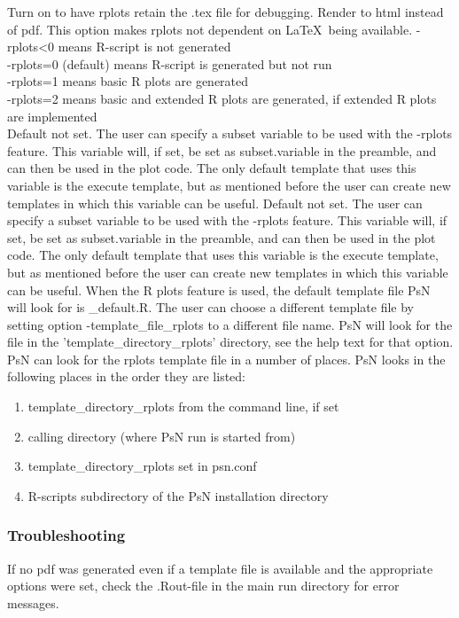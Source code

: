 \begin{optionlist}
Turn on to have rplots retain the .tex file for debugging.
\nextopt
        Render to html instead of pdf. This option makes rplots not dependent on \LaTeX\ being available.
    \nextopt
{}
-rplots<0 means R-script is not generated\\ 
-rplots=0 (default) means R-script is generated but not run\\ 
-rplots=1 means basic R plots are generated\\													  
-rplots=2 means basic and extended R plots are generated, if extended R plots are implemented\\													  
\nextopt
{}
Default not set. The user can specify a subset variable to be used with the -rplots feature. This variable will, if set, be set as subset.variable in the preamble, and can then be used in the plot code. The only default template that uses this variable is the execute template, but as mentioned before the user can create new templates in which this variable can be useful.
\nextopt
{}
Default not set. The user can specify a subset variable to be used with the -rplots feature. This variable will, if set, be set as subset.variable in the preamble, and can then be used in the plot code.  The only default template that uses this variable is the execute template, but as mentioned before the user can create new templates in which this variable can be useful.
\nextopt
{}
When the R plots feature is used, the default template file PsN will look for is \guidetoolname\_default.R. The user can choose a different template file by setting option -template\_file\_rplots to a different file name. PsN will look for the file in the 'template\_directory\_rplots' directory, see the help text for that option.
\nextopt
{}
PsN can look for the rplots template file in a number of places. PsN looks in the following places in the order they are listed:
\begin{enumerate}
\item template\_directory\_rplots from the command line, if set 
\item calling directory (where PsN run is started from)
\item template\_directory\_rplots set in psn.conf 
\item R-scripts subdirectory of the PsN installation directory
\end{enumerate}
\nextopt

\end{optionlist}

\subsubsection*{Troubleshooting}
If no pdf was generated even if a template file is available and the appropriate options were set, check the .Rout-file in the main run directory for error messages.
